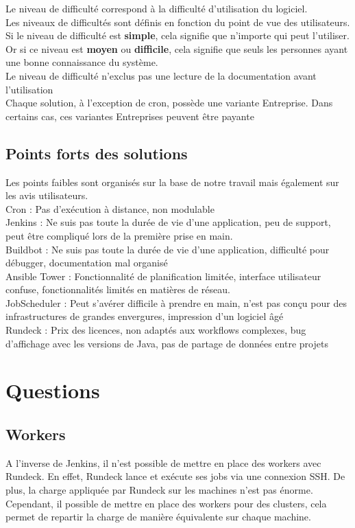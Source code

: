\documentclass[12pt]{article}
\begin{document}
\vspace{0.5cm}
Le niveau de difficulté correspond à la difficulté d'utilisation du logiciel.
\\
Les niveaux de difficultés sont définis en fonction du point de vue des utilisateurs. Si le niveau de difficulté est \textbf{simple}, cela signifie que n'importe qui peut l'utiliser. Or si ce niveau est \textbf{moyen} ou \textbf{difficile}, cela signifie que seuls les personnes ayant une bonne connaissance du système.
\\
Le niveau de difficulté n'exclus pas une lecture de la documentation avant l'utilisation
\\
Chaque solution, à l'exception de cron, possède une variante Entreprise. Dans certains cas, ces variantes Entreprises peuvent être payante

\subsection{Points forts des solutions}
Les points faibles sont organisés sur la base de notre travail mais également sur les avis utilisateurs.
\\
Cron : Pas d'exécution à distance, non modulable
\\
Jenkins : Ne suis pas toute la durée de vie d'une application, peu de support, peut être compliqué lors de la première prise en main.
\\
Buildbot : Ne suis pas toute la durée de vie d'une application, difficulté pour débugger, documentation mal organisé
\\
Ansible Tower : Fonctionnalité de planification limitée, interface utilisateur confuse, fonctionnalités limités en matières de réseau.
\\
JobScheduler : Peut s'avérer difficile à prendre en main, n'est pas conçu pour des infrastructures de grandes envergures, impression d'un logiciel âgé
\\
Rundeck : Prix des licences, non adaptés aux workflows complexes, bug d'affichage avec les versions de Java, pas de partage de données entre projets
    
\section{Questions}

\subsection{Workers}
A l'inverse de Jenkins, il n'est possible de mettre en place des workers avec Rundeck. En effet, Rundeck lance et exécute ses jobs via une connexion SSH. De plus, la charge appliquée par Rundeck sur les machines n'est pas énorme.
\\
Cependant, il possible de mettre en place des workers pour des clusters, cela permet de repartir la charge de manière équivalente sur chaque machine.
\end{document}
